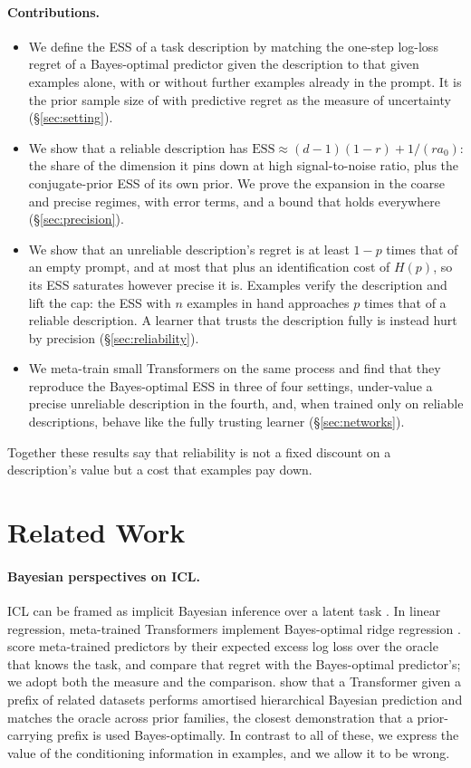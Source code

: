 \documentclass[10pt]{article}
\newcommand{\ess}{\mathrm{ESS}}
\begin{document}
\paragraph{Contributions.}
\begin{itemize}
    \item We define the ESS of a task description by matching the one-step log-loss regret of a Bayes-optimal predictor given the description to that given examples alone, with or without further examples already in the prompt. It is the prior sample size of \citet{reimherr2021} with predictive regret as the measure of uncertainty (\S\ref{sec:setting}).
    \item We show that a reliable description has $\ess \approx (d-1)(1-r) + 1/(r a_0)$: the share of the dimension it pins down at high signal-to-noise ratio, plus the conjugate-prior ESS of its own prior. We prove the expansion in the coarse and precise regimes, with error terms, and a bound that holds everywhere (\S\ref{sec:precision}).
    \item We show that an unreliable description's regret is at least $1-p$ times that of an empty prompt, and at most that plus an identification cost of $H(p)$, so its ESS saturates however precise it is. Examples verify the description and lift the cap: the ESS with $n$ examples in hand approaches $p$ times that of a reliable description. A learner that trusts the description fully is instead hurt by precision (\S\ref{sec:reliability}).
    \item We meta-train small Transformers on the same process and find that they reproduce the Bayes-optimal ESS in three of four settings, under-value a precise unreliable description in the fourth, and, when trained only on reliable descriptions, behave like the fully trusting learner (\S\ref{sec:networks}).
\end{itemize}
Together these results say that reliability is not a fixed discount on a description's value but a cost that examples pay down.

\section{Related Work}

\paragraph{Bayesian perspectives on ICL.}
ICL can be framed as implicit Bayesian inference over a latent task \citep{xie2022}. In linear regression, meta-trained Transformers implement Bayes-optimal ridge regression \citep{akyurek2023, raventos2023, panwar2024}. \citet{genewein2025} score meta-trained predictors by their expected excess log loss over the oracle that knows the task, and compare that regret with the Bayes-optimal predictor's; we adopt both the measure and the comparison. \citet{zhu2026} show that a Transformer given a prefix of related datasets performs amortised hierarchical Bayesian prediction and matches the oracle across prior families, the closest demonstration that a prior-carrying prefix is used Bayes-optimally. In contrast to all of these, we express the value of the conditioning information in examples, and we allow it to be wrong.
\end{document}
